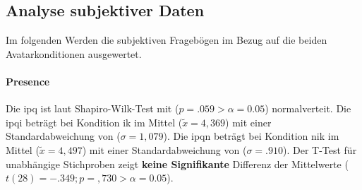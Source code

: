 \documentclass[a4paper,11pt]{article}%
\renewcommand{\\}{\vspace*{0.5\baselineskip} \newline}
\begin{document}


%
%
%
%
%
%	






\newpage
\subsection{Analyse subjektiver Daten}
Im folgenden Werden die subjektiven Fragebögen im Bezug auf die beiden Avatarkonditionen ausgewertet.

\paragraph{Presence}
Die \acf{ipq} ist laut Shapiro-Wilk-Test mit ($p = .059 > \alpha = 0.05$) normalverteit. 
Die \ac{ipqi} beträgt bei Kondition \ac{ik} im Mittel ($\tilde x = 4,369$) mit einer Standardabweichung von ($\sigma = 1,079$).
Die \ac{ipqn} beträgt bei Kondition \ac{nik} im Mittel ($\tilde x = 4,497$) mit einer Standardabweichung von ($\sigma = .910$).
Der T-Test für unabhängige Stichproben zeigt \textbf{keine Signifikante} Differenz der Mittelwerte  ($t(28) = -.349; p = ,730 > \alpha = 0.05$).
\end{document}
